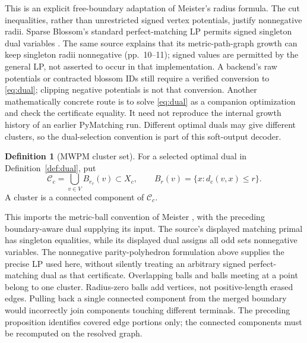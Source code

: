 \documentclass[11pt]{article}
\theoremstyle{definition}
\newtheorem{definition}{Definition}[section]
\theoremstyle{plain}
\theoremstyle{remark}
\begin{document}
This is an explicit free-boundary adaptation of Meister's radius
formula. The cut inequalities, rather than unrestricted signed
vertex potentials, justify nonnegative radii. Sparse Blossom's
standard perfect-matching LP permits signed singleton dual variables
\cite[Sec.~2.5.2, p.~8, Eqs.~(4)--(6)]{SparseBlossom}.
The same source explains that its metric-path-graph growth can keep
singleton radii nonnegative (pp.~10--11); signed values are permitted
by the general LP, not asserted to occur in that implementation.
A backend's raw potentials or contracted blossom IDs still
require a verified conversion to \eqref{eq:dual}; clipping negative
potentials is not that conversion. Another mathematically concrete
route is to solve \eqref{eq:dual} as a companion optimization and
check the certificate equality. It need not reproduce the internal
growth history of an earlier PyMatching run. Different optimal duals
may give different clusters, so the dual-selection convention is
part of this soft-output decoder.

\begin{definition}[MWPM cluster set]\label{def:clusters}
For a selected optimal dual in Definition~\ref{def:dual}, put
\[
 \mathcal C_c=\bigcup_{v\in V}B_{r_v}(v)\subset X_c,\qquad
 B_r(v)=\{x:d_c(v,x)\le r\}.
\]
A cluster is a connected component of $\mathcal C_c$.
\end{definition}
This imports the metric-ball convention of Meister
\cite[Definition~1 and Appendix~B]{Meister}, with the preceding
boundary-aware dual supplying its input.
The source's displayed matching primal has singleton equalities,
while its displayed dual assigns all odd sets nonnegative variables.
The nonnegative parity-polyhedron formulation above supplies the
precise LP used here, without silently treating an arbitrary signed
perfect-matching dual as that certificate.
Overlapping balls and balls meeting at a point belong to one cluster.
Radius-zero balls add vertices, not positive-length erased edges.
Pulling back a single connected component from the merged boundary
would incorrectly join components touching different terminals.
The preceding proposition identifies covered edge portions only;
the connected components must be recomputed on the resolved graph.
\end{document}
